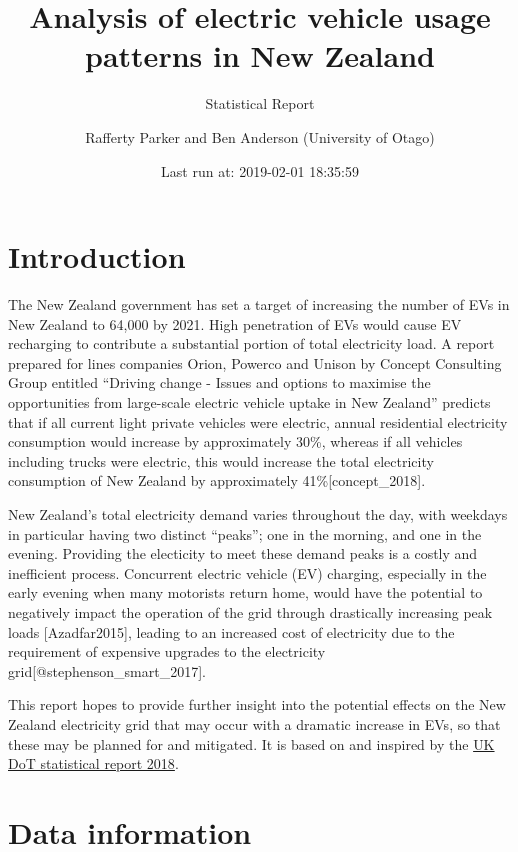 \documentclass[]{article}
\title{Analysis of electric vehicle usage patterns in New Zealand}
\subtitle{Statistical Report}
\author{Rafferty Parker and Ben Anderson (University of Otago)}
\date{Last run at: 2019-02-01 18:35:59}
\begin{document}
\maketitle

{
\setcounter{tocdepth}{2}
\tableofcontents
}
\section{Introduction}\label{introduction}

The New Zealand government has set a target of increasing the number of
EVs in New Zealand to 64,000 by 2021. High penetration of EVs would
cause EV recharging to contribute a substantial portion of total
electricity load. A report prepared for lines companies Orion, Powerco
and Unison by Concept Consulting Group entitled ``Driving change -
Issues and options to maximise the opportunities from large-scale
electric vehicle uptake in New Zealand'' predicts that if all current
light private vehicles were electric, annual residential electricity
consumption would increase by approximately 30\%, whereas if all
vehicles including trucks were electric, this would increase the total
electricity consumption of New Zealand by approximately
41\%{[}concept\_2018{]}.

New Zealand's total electricity demand varies throughout the day, with
weekdays in particular having two distinct ``peaks''; one in the
morning, and one in the evening. Providing the electicity to meet these
demand peaks is a costly and inefficient process. Concurrent electric
vehicle (EV) charging, especially in the early evening when many
motorists return home, would have the potential to negatively impact the
operation of the grid through drastically increasing peak loads
{[}Azadfar2015{]}, leading to an increased cost of electricity due to
the requirement of expensive upgrades to the electricity
grid{[}@stephenson\_smart\_2017{]}.

This report hopes to provide further insight into the potential effects
on the New Zealand electricity grid that may occur with a dramatic
increase in EVs, so that these may be planned for and mitigated. It is
based on and inspired by the
\href{https://assets.publishing.service.gov.uk/government/uploads/system/uploads/attachment_data/file/764270/electric-chargepoint-analysis-2017-domestics.pdf}{UK
DoT statistical report 2018}.

\section{Data information}\label{data}
\end{document}
